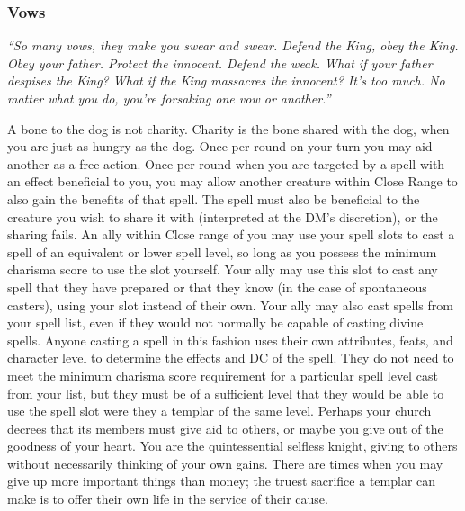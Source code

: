 \vspace{8pt}
\begin{optional}
\subsubsection{Vows}
\noindent\textit{``So many vows, they make you swear and swear. Defend the King, obey the King. Obey your father. Protect the innocent. Defend the weak. What if your father despises the King? What if the King massacres the innocent? It's too much. No matter what you do, you're forsaking one vow or another.''}

{A bone to the dog is not charity. Charity is the bone shared with the dog, when you are just as hungry as the dog.}
{Once per round on your turn you may aid another as a free action.}
{Once per round when you are targeted by a spell with an effect beneficial to you, you may allow another creature within Close Range to also gain the benefits of that spell. The spell must also be beneficial to the creature you wish to share it with (interpreted at the DM's discretion), or the sharing fails.}
{An ally within Close range of you may use your spell slots to cast a spell of an equivalent or lower spell level, so long as you possess the minimum charisma score to use the slot yourself. Your ally may use this slot to cast any spell that they have prepared or that they know (in the case of spontaneous casters), using your slot instead of their own. Your ally may also cast spells from your spell list, even if they would not normally be capable of casting divine spells. Anyone casting a spell in this fashion uses their own attributes, feats, and character level to determine the effects and DC of the spell. They do not need to meet the minimum charisma score requirement for a particular spell level cast from your list, but they must be of a sufficient level that they would be able to use the spell slot were they a templar of the same level.}
{Perhaps your church decrees that its members must give aid to others, or maybe you give out of the goodness of your heart. You are the quintessential selfless knight, giving to others without necessarily thinking of your own gains. There are times when you may give up more important things than money; the truest sacrifice a templar can make is to offer their own life in the service of their cause.}


\end{optional}
